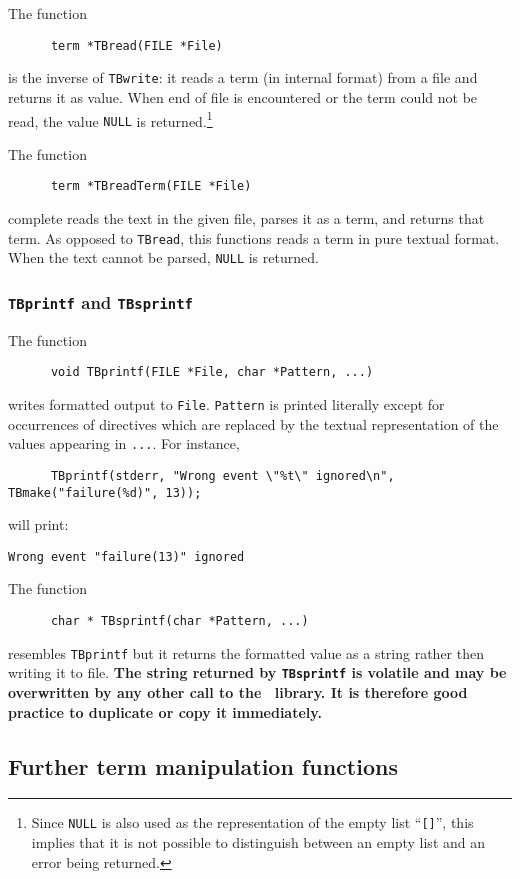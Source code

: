 The function
\begin{verbatim}
      term *TBread(FILE *File)
\end{verbatim}
is the inverse of {\tt TBwrite}: it reads a term (in internal format)
from a file and returns it as value. When end of file is encountered
or the term could not be read, the value {\tt NULL} is
returned.\footnote{Since {\tt NULL} is also used as the representation
of the empty list ``{\tt []}'', this implies that it is not possible
to distinguish between an empty list and an error being returned.}

The function
\begin{verbatim}
      term *TBreadTerm(FILE *File)
\end{verbatim}
complete reads the text in the given file, parses it as a term, and returns that term.
As opposed to {\tt TBread}, this functions reads a term in pure textual
format. When the text cannot be parsed, {\tt NULL} is returned.

\subsubsection{\label{TBprintf}{\tt TBprintf} and {\tt TBsprintf}}
The function
\begin{verbatim}
      void TBprintf(FILE *File, char *Pattern, ...)
\end{verbatim}
writes formatted output to {\tt File}.
{\tt Pattern} is printed literally except for occurrences
of directives which are replaced by the textual representation
of the values appearing in {\tt ...}. For instance,
\begin{verbatim}
      TBprintf(stderr, "Wrong event \"%t\" ignored\n", TBmake("failure(%d)", 13));
\end{verbatim}
will print:
\begin{verbatim}
Wrong event "failure(13)" ignored
\end{verbatim}

\noindent The function
\begin{verbatim}
      char * TBsprintf(char *Pattern, ...)
\end{verbatim}
resembles {\tt TBprintf} but it returns the formatted value as a string
rather then writing it to file. {\bf The string returned by {\tt TBsprintf}
is volatile and may be overwritten by any other call to the
\TB\ library. It is therefore good practice to duplicate or
copy it immediately.}

\subsection{\label{TermManipulation}Further term manipulation functions}

